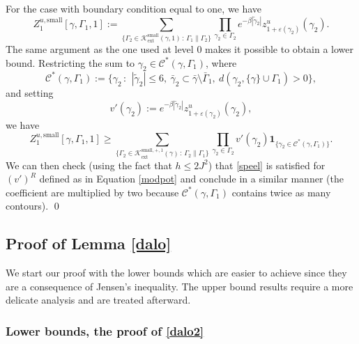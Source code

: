 \documentclass[JEP,XML,SOM,Unicode, NoFloatCountersInSection]{cedram}
\let\mathcal\mathscr
\newcommand{\sep}{\,:\,}
\numberwithin{equation}{section}
\theoremstyle{plain}
\theoremstyle{definition}
\newcommand{\ext}{\mathrm{ext}}
\newcommand{\sm}{\mathrm{small}}
\newcommand{\ind}{\mathbf{1}}
\newcommand{\cC}{{\ensuremath{\mathcal C}} }
\newcommand{\cK}{{\ensuremath{\mathcal K}} }
\newcommand{\gb}{\beta}
\newcommand{\gep}{\varepsilon}
\newcommand{\gG}{\Gamma}
\begin{document}
For the case with boundary condition equal to one, we have
\begin{equation}\label{sumikr}
Z^{u,\sm}_{1}[\gamma,\gG_1,1]:= \sum_{\{ \gG_2 \in \cK^{\sm}_{\ext}(\gamma,1) \sep \gG_1 \parallel \gG_2\}}
\prod_{\gamma_2\in \gG_2 }
e^{-\gb |\tilde\gamma_2|}
z^u_{1+\gep(\gamma_2)}(\gamma_2).
\end{equation}
The same argument as the one used at level $0$ makes it possible to obtain a lower bound.
Restric\-ting the sum to $\gamma_2\in \cC^{*}(\gamma,\gG_1)$, where
\[
\cC^{*}(\gamma,\gG_1):=\{ \gamma_2 \sep \ |\tilde \gamma_2|\le 6,\ \bar \gamma_2\subset \bar \gamma \setminus \bar \gG_1,\
d(\gamma_2, \{\gamma\}\cup \gG_1)>0 \},
\]
and setting
\[
v'(\gamma_2):=e^{-\gb |\tilde\gamma_2|}
z^u_{1+\gep(\gamma_2)}(\gamma_2),
\]
we have
\begin{equation*}
Z^{u,\sm}_{1}[\gamma,\gG_1,1]
\ge \sum_{\{ \gG_2 \in \cK^{\sm,+,1}_{\ext}(\gamma) \sep \gG_2 \parallel \gG_1\}} \prod_{\gamma_2\in \gG_2 }
v'(\gamma_2)\ind_{\{\gamma_2\in \cC^*(\gamma,\gG_1)\}}.
\end{equation*}
We can then check (using the fact that $h\le 2J^2$) that \eqref{speel} is satisfied for $(v')^R$ defined as in Equation \eqref{modpot}
and conclude in a similar manner (the coefficient are multiplied by two because $\cC^{*}(\gamma,\gG_1)$ contains twice as many contours).
\qed

\subsection{Proof of Lemma \ref{dalo}}

We start our proof with the lower bounds which are easier to achieve since they are a consequence of Jensen's inequality.
The upper bound results require a more delicate analysis and are treated afterward.

\subsubsection{Lower bounds, the proof of \eqref{dalo2}}
\end{document}
